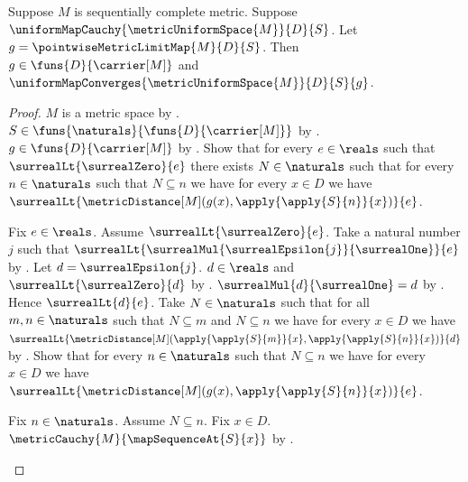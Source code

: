 \begin{theorem}\label{uniformly_cauchy_maps_have_uniform_limit_in_sequentially_complete_metric}
    Suppose $M$ is sequentially complete metric.
    Suppose $\uniformMapCauchy{\metricUniformSpace{M}}{D}{S}$.
    Let $g=\pointwiseMetricLimitMap{M}{D}{S}$.
    Then $g\in\funs{D}{\carrier[M]}$ and
        $\uniformMapConverges{\metricUniformSpace{M}}{D}{S}{g}$.
\end{theorem}
\begin{proof}
    $M$ is a metric space
        by .
    $S\in\funs{\naturals}{\funs{D}{\carrier[M]}}$
        by .
    $g\in\funs{D}{\carrier[M]}$
        by .
    Show that for every $e\in\reals$ such that
        $\surrealLt{\surrealZero}{e}$ there exists $N\in\naturals$
        such that for every $n\in\naturals$ such that $N\subseteq n$
        we have for every $x\in D$ we have
            $\surrealLt{\metricDistance[M]
                (g(x),\apply{\apply{S}{n}}{x})}{e}$.
    \begin{subproof}
        Fix $e\in\reals$.
        Assume $\surrealLt{\surrealZero}{e}$.
        Take a natural number $j$ such that
            $\surrealLt{
                \surrealMul{\surrealEpsilon{j}}{\surrealOne}}{e}$
            by
            .
        Let $d=\surrealEpsilon{j}$.
        $d\in\reals$ and $\surrealLt{\surrealZero}{d}$
            by .
        $\surrealMul{d}{\surrealOne}=d$
            by .
        Hence $\surrealLt{d}{e}$.
        Take $N\in\naturals$ such that for all $m,n\in\naturals$
            such that $N\subseteq m$ and $N\subseteq n$ we have
            for every $x\in D$ we have
            $\surrealLt{\metricDistance[M]
                (\apply{\apply{S}{m}}{x},
                 \apply{\apply{S}{n}}{x})}{d}$
            by .
        Show that for every $n\in\naturals$ such that $N\subseteq n$
            we have for every $x\in D$ we have
            $\surrealLt{\metricDistance[M]
                (g(x),\apply{\apply{S}{n}}{x})}{e}$.
        \begin{subproof}
            Fix $n\in\naturals$.
            Assume $N\subseteq n$.
            Fix $x\in D$.
            $\metricCauchy{M}{\mapSequenceAt{S}{x}}$
                by .

\end{subproof}
\end{subproof}
\end{proof}
